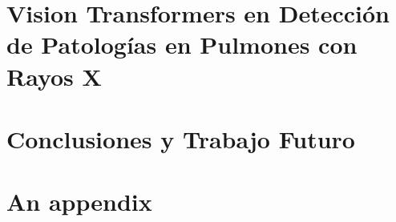\documentclass[12pt, oneside]{book}
\begin{document}
\chapter{Vision Transformers en Detección de Patologías en Pulmones con Rayos X}


\chapter{Conclusiones y Trabajo Futuro}

\appendix


\chapter{An appendix}


% 





\end{document}
